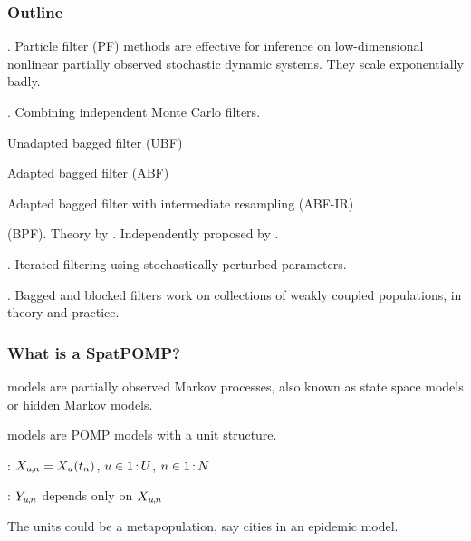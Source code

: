 \documentclass{beamer}
\begin{document}
\begin{frame}
  \frametitle{Outline}

  
  . Particle filter (PF) methods are effective for inference on low-dimensional nonlinear partially observed stochastic dynamic systems. They scale exponentially badly.

  \challengeSep
  
  . Combining independent Monte Carlo filters.

  \vspace{1mm}
  
  \begin{myitemize}
  \item Unadapted bagged filter (UBF)
  \item Adapted bagged filter (ABF)
    \item Adapted bagged filter with intermediate resampling (ABF-IR)
  \end{myitemize}

  \challengeSep

   (BPF). Theory by \citet{rebeschini15}. Independently proposed by \citet{ng02}.

  \challengeSep

  . Iterated filtering using stochastically perturbed parameters.

  \challengeSep

  . Bagged and blocked filters work on collections of weakly coupled populations, in theory and practice.

\end{frame}

\begin{frame}

  \frametitle{What is a SpatPOMP?}

   models are partially observed Markov processes, also known as state space models or hidden Markov models.

  \vspace{6mm}
  
   models are POMP models with a unit structure.

    \vspace{6mm}
 
  : $X_{u{\hspace{-0.25mm},\hspace{-0.2mm}}n}=X_{u}(t_n)$, \hspace{1mm} $u\in 1{{\hspace{0.6mm}:\hspace{0.6mm}}}U$, \hspace{1mm} $n\in 1{{\hspace{0.6mm}:\hspace{0.6mm}}}N$

    \vspace{6mm}
 
  : $Y_{u{\hspace{-0.25mm},\hspace{-0.2mm}}n}$ depends only on $X_{u{\hspace{-0.25mm},\hspace{-0.2mm}}n}$

    \vspace{6mm}
 
The units could be a metapopulation, say cities in an epidemic model.

\end{frame}
\end{document}
